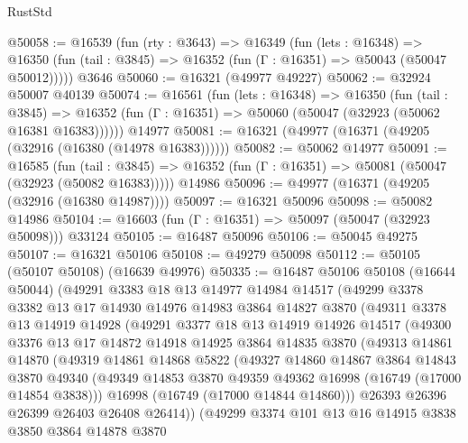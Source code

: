 \begin{lexlean}{RustStd}
\begin{coremodule}
@50058 := @16539
    (fun (rty : @3643) =>
    @16349
      (fun (lets : @16348) =>
      @16350 (fun (tail : @3845) => @16352 (fun (Γ : @16351) => @50043 (@50047 @50012)))))
    @3646
@50060 := @16321 (@49977 @49227)
@50062 := @32924 @50007 @40139
@50074 := @16561
    (fun (lets : @16348) =>
    @16350
      (fun (tail : @3845) =>
      @16352 (fun (Γ : @16351) => @50060 (@50047 (@32923 (@50062 @16381 @16383))))))
    @14977
@50081 := @16321 (@49977 (@16371 (@49205 (@32916 (@16380 (@14978 @16383))))))
@50082 := @50062 @14977
@50091 := @16585
    (fun (tail : @3845) => @16352 (fun (Γ : @16351) => @50081 (@50047 (@32923 (@50082 @16383)))))
    @14986
@50096 := @49977 (@16371 (@49205 (@32916 (@16380 @14987))))
@50097 := @16321 @50096
@50098 := @50082 @14986
@50104 := @16603 (fun (Γ : @16351) => @50097 (@50047 (@32923 @50098))) @33124
@50105 := @16487 @50096
@50106 := @50045 @49275
@50107 := @16321 @50106
@50108 := @49279 @50098
@50112 := @50105 (@50107 @50108) (@16639 @49976)
@50335 := @16487
    @50106
    @50108
    (@16644 @50044)
    (@49291
      @3383
      @18
      @13
      @14977
      @14984
      @14517
      (@49299
        @3378
        @3382
        @13
        @17
        @14930
        @14976
        @14983
        @3864
        @14827
        @3870
        (@49311
          @3378
          @13
          @14919
          @14928
          (@49291
            @3377
            @18
            @13
            @14919
            @14926
            @14517
            (@49300
              @3376
              @13
              @17
              @14872
              @14918
              @14925
              @3864
              @14835
              @3870
              (@49313
                @14861
                @14870
                (@49319
                  @14861
                  @14868
                  @5822
                  (@49327
                    @14860
                    @14867
                    @3864
                    @14843
                    @3870
                    @49340
                    (@49349 @14853 @3870 @49359 @49362 @16998 (@16749 (@17000 @14854 @3838)))
                    @16998
                    (@16749 (@17000 @14844 @14860)))
                  @26393
                  @26396
                  @26399
                  @26403
                  @26408
                  @26414))
              (@49299
                @3374
                @101
                @13
                @16
                @14915
                @3838
                @3850
                @3864
                @14878
                @3870

\end{coremodule}
\end{lexlean}
